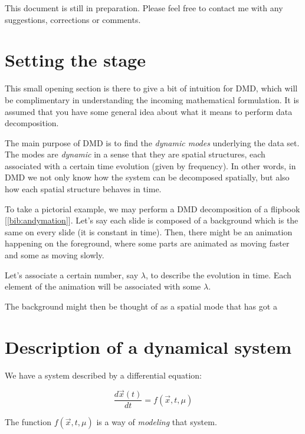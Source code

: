 \documentclass[10pt,twocolumn]{article}
\begin{document}
This document is still in preparation. Please feel free to contact me with any suggestions, corrections or comments.

\tableofcontents


\vspace{10mm}

\section{Setting the stage}

This small opening section is there to give a bit of intuition for DMD, which will be complimentary in understanding the incoming mathematical formulation. It is assumed that you have some general idea about what it means to perform data decomposition.

The main purpose of DMD is to find the \textit{dynamic modes} underlying the data set. The modes are \textit{dynamic} in a sense that they are spatial structures, each associated with a certain time evolution (given by frequency). In other words, in DMD we not only know how the system can be decomposed spatially, but also how each spatial structure behaves in time.

To take a pictorial example, we may perform a DMD decomposition of a flipbook [\ref{bib:andymation}]. Let's say each slide is composed of a background which is the same on every slide (it is constant in time). Then, there might be an animation happening on the foreground, where some parts are animated as moving faster and some as moving slowly.

Let's associate a certain number, say $\lambda$, to describe the evolution in time. Each element of the animation will be associated with some $\lambda$.

The background might then be thought of as a spatial mode that has got a 


\section{Description of a dynamical system}

We have a system described by a differential equation:

\begin{equation} \label{eq:system_DE}
\frac{d \vec{x}(t)}{dt} = f(\vec{x}, t, \mu)
\end{equation}

The function $f(\vec{x}, t, \mu)$ is a way of \textit{modeling} that system.
\end{document}
